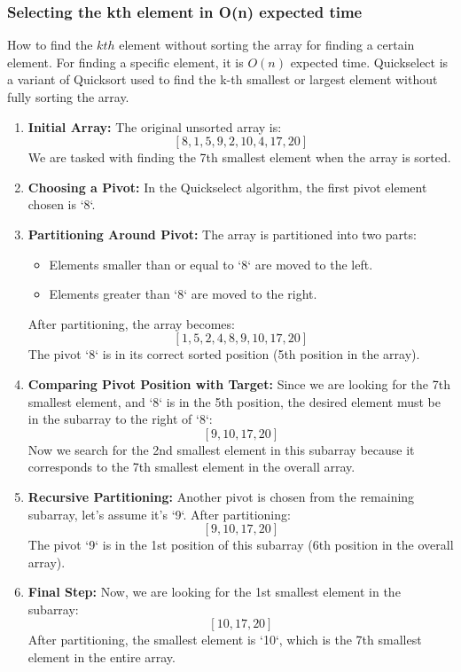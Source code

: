    \subsubsection{Selecting the kth element in O(n) expected time}
    \begin{example}
        How to find the $kth$ element without sorting the array for finding a certain element. For finding a specific element, it is $O(n)$ expected time. Quickselect is a variant of Quicksort used to find the
        k-th smallest or largest element without fully sorting the array.            
        \begin{enumerate}
            \item \textbf{Initial Array:} The original unsorted array is:
            \[
            [8, 1, 5, 9, 2, 10, 4, 17, 20]
            \]
            We are tasked with finding the 7th smallest element when the array is sorted.
            
            \item \textbf{Choosing a Pivot:} In the Quickselect algorithm, the first pivot element chosen is `8`.
            
            \item \textbf{Partitioning Around Pivot:} The array is partitioned into two parts:
            \begin{itemize}
                \item Elements smaller than or equal to `8` are moved to the left.
                \item Elements greater than `8` are moved to the right.
            \end{itemize}
            After partitioning, the array becomes:
            \[
            [1, 5, 2, 4, 8, 9, 10, 17, 20]
            \]
            The pivot `8` is in its correct sorted position (5th position in the array).
            
            \item \textbf{Comparing Pivot Position with Target:} Since we are looking for the 7th smallest element, and `8` is in the 5th position, the desired element must be in the subarray to the right of `8`:
            \[
            [9, 10, 17, 20]
            \]
            Now we search for the 2nd smallest element in this subarray because it corresponds to the 7th smallest element in the overall array.
            
            \item \textbf{Recursive Partitioning:} Another pivot is chosen from the remaining subarray, let’s assume it’s `9`. After partitioning:
            \[
            [9, 10, 17, 20]
            \]
            The pivot `9` is in the 1st position of this subarray (6th position in the overall array).
            
            \item \textbf{Final Step:} Now, we are looking for the 1st smallest element in the subarray:
            \[
            [10, 17, 20]
            \]
            After partitioning, the smallest element is `10`, which is the 7th smallest element in the entire array.
        \end{enumerate}        
    \end{example}